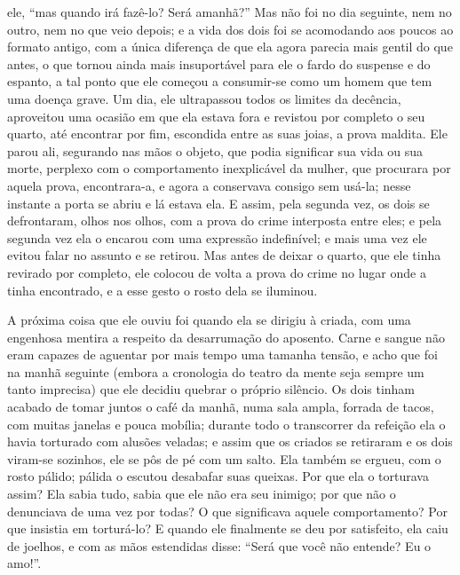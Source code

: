 ele, “mas quando irá fazê-lo?  Será amanhã?”  Mas não foi no dia
seguinte, nem no outro, nem no que veio depois; e a vida dos dois foi
se acomodando aos poucos ao formato antigo, com a única diferença de
que ela agora parecia mais gentil do que antes, o que tornou ainda mais
insuportável para ele o fardo do suspense e do espanto, a tal ponto que
ele começou a consumir-se como um homem que tem uma doença grave.  Um
dia, ele ultrapassou todos os limites da decência, aproveitou uma
ocasião em que ela estava fora e revistou por completo o seu quarto,
até encontrar por fim, escondida entre as suas joias, a prova maldita. 
Ele parou ali, segurando nas mãos o objeto, que podia significar sua
vida ou sua morte, perplexo com o comportamento inexplicável da
mulher, que procurara por aquela prova, encontrara-a, e agora a
conservava consigo sem usá-la; nesse instante a porta se abriu e
lá estava ela.  E assim, pela segunda vez, os dois se defrontaram,
olhos nos olhos, com a prova do crime interposta entre eles; e pela
segunda vez ela o encarou com uma expressão indefinível; e mais uma vez
ele evitou falar no assunto e se retirou.  Mas antes de deixar o
quarto, que ele tinha revirado por completo, ele colocou de volta a
prova do crime no lugar onde a tinha encontrado, e a esse gesto o rosto
dela se iluminou.

A próxima coisa que ele ouviu foi quando ela se dirigiu à criada, com
uma engenhosa mentira a respeito da desarrumação do aposento.  Carne e
sangue não eram capazes de aguentar por mais tempo uma tamanha tensão,
e acho que foi na manhã seguinte (embora a cronologia do teatro da
mente seja sempre um tanto imprecisa)  que ele decidiu quebrar o
próprio silêncio.  Os dois tinham acabado de tomar juntos o café da
manhã, numa sala ampla, forrada de tacos, com muitas janelas e pouca
mobília; durante todo o transcorrer da refeição ela o havia torturado
com alusões veladas; e assim que os criados se retiraram e os dois
viram-se sozinhos, ele se pôs de pé com um salto.  Ela também se
ergueu, com o rosto pálido;  pálida o escutou desabafar suas queixas.
Por que ela o torturava assim?  Ela sabia tudo, sabia que ele
não era seu inimigo; por que não o denunciava de uma vez por todas?  O
que significava aquele comportamento?  Por que insistia em torturá-lo? 
E quando ele finalmente se deu por satisfeito, ela caiu de joelhos, e
com as mãos estendidas disse: “Será que você não entende?  Eu o amo!”.

